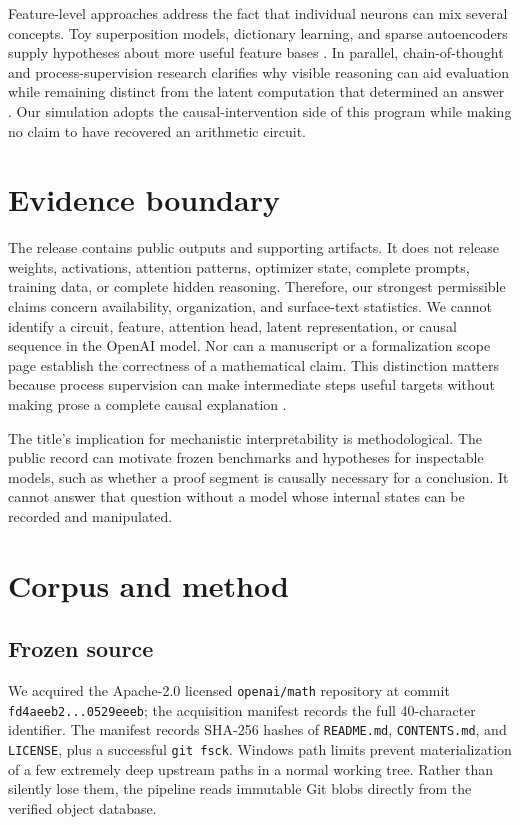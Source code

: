 \documentclass[11pt]{article}
\begin{document}
Feature-level approaches address the fact that individual neurons can mix
several concepts. Toy superposition models, dictionary learning, and sparse
autoencoders supply hypotheses about more useful feature bases
\citep{elhage2022toy,bricken2023monosemantic,cunningham2023sparse,templeton2024scaling}.
In parallel, chain-of-thought and process-supervision research clarifies why
visible reasoning can aid evaluation while remaining distinct from the latent
computation that determined an answer
\citep{wei2022cot,lyu2023faithful,turpin2023language,lanham2023measuring,lightman2023verify}.
Our simulation adopts the causal-intervention side of this program while
making no claim to have recovered an arithmetic circuit.

\section{Evidence boundary}

The release contains public outputs and supporting artifacts. It does not
release weights, activations, attention patterns, optimizer state, complete
prompts, training data, or complete hidden reasoning. Therefore, our strongest
permissible claims concern availability, organization, and surface-text
statistics. We cannot identify a circuit, feature, attention head, latent
representation, or causal sequence in the OpenAI model. Nor can a manuscript
or a formalization scope page establish the correctness of a mathematical
claim. This distinction matters because process supervision can make
intermediate steps useful targets without making prose a complete causal
explanation \citep{lightman2023verify}.

The title's implication for mechanistic interpretability is methodological.
The public record can motivate frozen benchmarks and hypotheses for inspectable
models, such as whether a proof segment is causally necessary for a conclusion.
It cannot answer that question without a model whose internal states can be
recorded and manipulated.

\section{Corpus and method}

\subsection{Frozen source}

We acquired the Apache-2.0 licensed \texttt{openai/math} repository at commit
\texttt{fd4aeeb2...0529eeeb}; the acquisition manifest records the full
40-character identifier. The manifest
records SHA-256 hashes of \texttt{README.md}, \texttt{CONTENTS.md}, and
\texttt{LICENSE}, plus a successful \texttt{git fsck}. Windows path limits
prevent materialization of a few extremely deep upstream paths in a normal
working tree. Rather than silently lose them, the pipeline reads immutable Git
blobs directly from the verified object database.
\end{document}
